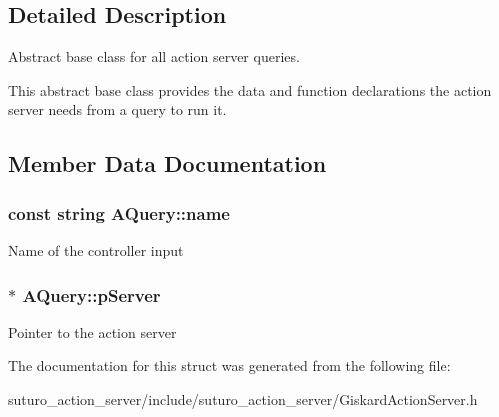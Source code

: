 \subsection{Detailed Description}
Abstract base class for all action server queries. 

This abstract base class provides the data and function declarations the action server needs from a query to run it. 

\subsection{Member Data Documentation}
\hypertarget{structAQuery_a209eec59fbdf038ec7de39db059ddaa4}{
\subsubsection[{name}]{\setlength{\rightskip}{0pt plus 5cm}const string A\-Query\-::name\hspace{0.3cm}{\ttfamily [protected]}}}\label{structAQuery_a209eec59fbdf038ec7de39db059ddaa4}
Name of the controller input \hypertarget{structAQuery_ae8c350ae2bc8715fb1e1eec2ff099269}{
\subsubsection[{p\-Server}]{$\ast$ A\-Query\-::p\-Server\hspace{0.3cm}{\ttfamily [protected]}}}\label{structAQuery_ae8c350ae2bc8715fb1e1eec2ff099269}
Pointer to the action server 

The documentation for this struct was generated from the following file\-:\begin{DoxyCompactItemize}
\item 
suturo\-\_\-action\-\_\-server/include/suturo\-\_\-action\-\_\-server/Giskard\-Action\-Server.\-h\end{DoxyCompactItemize}
